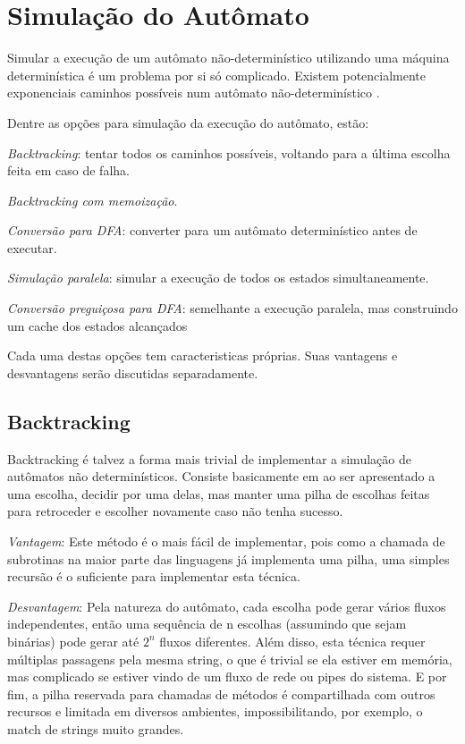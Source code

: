 \documentclass[a4paper,12pt,oneside,onecolumn]{uerj}
\begin{document}
\section{Simulação do Autômato}

Simular a execução de um autômato não-determinístico utilizando uma máquina determinística é um problema por si só complicado. Existem potencialmente exponenciais caminhos possíveis num autômato não-determinístico \cite{bib:Rabin59}.

Dentre as opções para simulação da execução do autômato, estão:

\begin{lcircp}
    \item \emph{Backtracking}: tentar todos os caminhos possíveis, voltando para a última escolha feita em caso de falha.
    \item \emph{Backtracking com memoização}.
    \item \emph{Conversão para DFA}: converter para um autômato determinístico antes de executar.
    \item \emph{Simulação paralela}: simular a execução de todos os estados simultaneamente.
	\item \emph{Conversão preguiçosa para DFA}: semelhante a execução paralela, mas construindo um cache dos estados alcançados
\end{lcircp}

Cada uma destas opções tem caracteristicas próprias. Suas vantagens e desvantagens serão discutidas separadamente.

\subsection{Backtracking}

Backtracking é talvez a forma mais trivial de implementar a simulação de autômatos não determinísticos. Consiste basicamente em ao ser apresentado a uma escolha, decidir por uma delas, mas manter uma pilha de escolhas feitas para retroceder e escolher novamente caso não tenha sucesso.

\emph{Vantagem}: Este método é o mais fácil de implementar, pois como a chamada de subrotinas na maior parte das linguagens já implementa uma pilha, uma simples recursão é o suficiente para implementar esta técnica.

\emph{Desvantagem}: Pela natureza do autômato, cada escolha pode gerar vários fluxos independentes, então uma sequência de n escolhas (assumindo que sejam binárias) pode gerar até $2^n$ fluxos diferentes. Além disso, esta técnica requer múltiplas passagens pela mesma string, o que é trivial se ela estiver em memória, mas complicado se estiver vindo de um fluxo de rede ou pipes do sistema. E por fim, a pilha reservada para chamadas de métodos é compartilhada com outros recursos e limitada em diversos ambientes, impossibilitando, por exemplo, o match de strings muito grandes.
\end{document}
